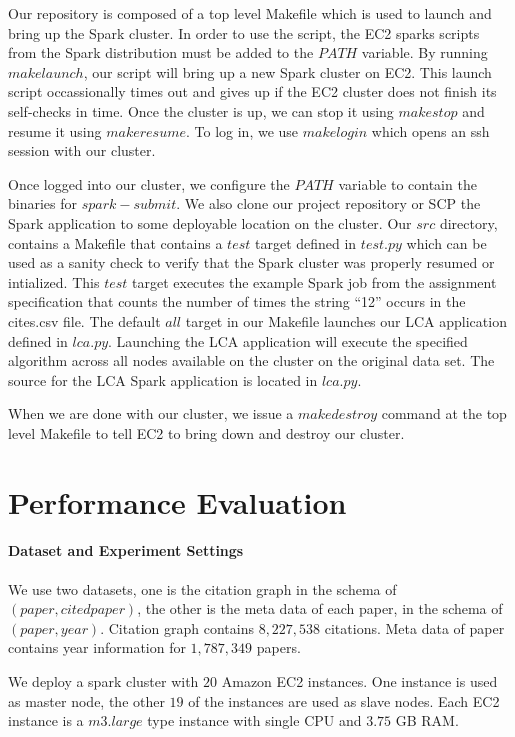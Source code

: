 \documentclass{article}
\begin{document}
Our repository is composed of a top level Makefile which is used to launch and bring up the Spark cluster.
In order to use the script, the EC2 sparks scripts from the Spark distribution must be added to the $PATH$ variable.
By running $make launch$, our script will bring up a new Spark cluster on EC2.
This launch script occassionally times out and gives up if the EC2 cluster does not finish its self-checks in time.
Once the cluster is up, we can stop it using $make stop$ and resume it using $make resume$.
To log in, we use $make login$ which opens an ssh session with our cluster.

Once logged into our cluster, we configure the $PATH$ variable to contain the binaries for $spark-submit$.
We also clone our project repository or SCP the Spark application to some deployable location on the cluster.
Our $src$ directory, contains a Makefile that contains a $test$ target defined in $test.py$ which can be used as a sanity check to verify that the Spark cluster was properly resumed or intialized.
This $test$ target executes the example Spark job from the assignment specification that counts the number of times the string ``12'' occurs in the cites.csv file.
The default $all$ target in our Makefile launches our LCA application defined in $lca.py$.
Launching the LCA application will execute the specified algorithm across all nodes available on the cluster on the original data set.
The source for the LCA Spark application is located in $lca.py$.

When we are done with our cluster, we issue a $make destroy$ command at the top level Makefile to tell EC2 to bring down and destroy our cluster.

\section{Performance Evaluation}

\paragraph{Dataset and Experiment Settings}
We use two datasets, one is the citation graph in the schema of 
$(paper, cited paper)$, the other is the meta data of each paper, in the schema
of $(paper, year)$. Citation graph contains $8,227,538$ citations. Meta data 
of paper contains year information for $1,787,349$ papers.

We deploy a spark cluster with $20$ Amazon EC2 instances. One instance is used
as master node, the other $19$ of the instances are used as slave nodes. 
Each EC2 instance is a $m3.large$ type instance with single CPU and $3.75$ GB
RAM.
\end{document}

